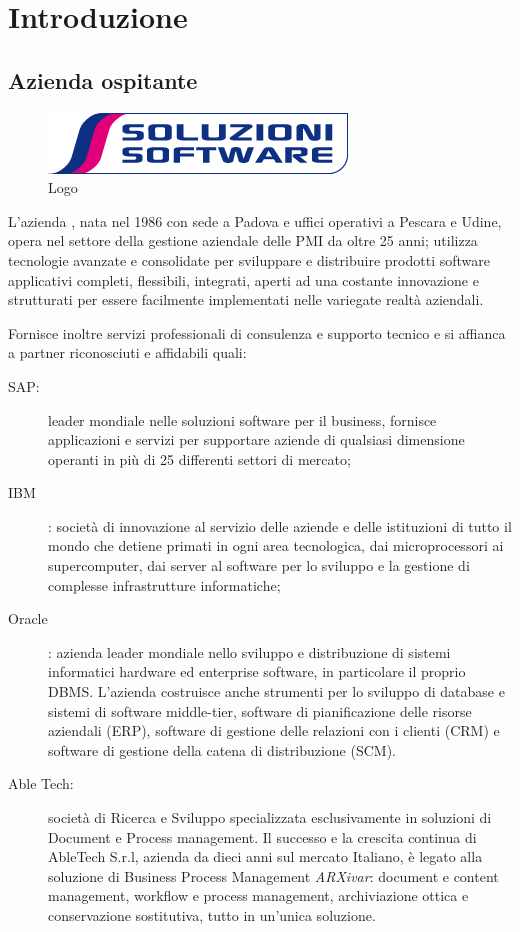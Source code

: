 \chapter{Introduzione}\label{ch:introduzione}

\section{Azienda ospitante}

\begin{figure}[htb]
\centering
\includegraphics[scale=0.7]{gfx/S2_logo}
\caption{Logo \myCompanyExtended}
\label{fig:soluzioni software}
\end{figure}

L'azienda \myCompanyExtended, nata nel 1986 con sede a Padova e uffici operativi a Pescara e Udine, opera nel settore della gestione aziendale delle \acs{PMI} da oltre 25 anni; utilizza tecnologie avanzate e consolidate per sviluppare e distribuire prodotti software applicativi completi, flessibili, integrati, aperti ad una costante innovazione e strutturati per essere facilmente implementati nelle variegate realtà aziendali.

Fornisce inoltre servizi professionali di consulenza e supporto tecnico e si affianca a partner riconosciuti e affidabili quali:
\begin{description}
	\item[SAP:] leader mondiale nelle soluzioni software per il business, fornisce applicazioni e servizi per supportare aziende di qualsiasi dimensione operanti in più di 25 differenti settori di mercato;
	\item[IBM]: società di innovazione al servizio delle aziende e delle istituzioni di tutto il mondo che detiene primati in ogni area tecnologica, dai microprocessori ai supercomputer, dai server al software per lo sviluppo e la gestione di complesse infrastrutture informatiche;
	\item[Oracle]: azienda leader mondiale nello sviluppo e distribuzione di sistemi informatici hardware ed enterprise software, in particolare il proprio \ac{DBMS}.
	L'azienda costruisce anche strumenti per lo sviluppo di database e sistemi di software middle-tier, software di pianificazione delle risorse aziendali (\ac{ERP}), software di gestione delle relazioni con i clienti (\ac{CRM}) e software di gestione della catena di distribuzione (\ac{SCM}).
	\item[Able Tech:] società di Ricerca e Sviluppo specializzata esclusivamente in soluzioni di Document e Process management. Il successo e la crescita continua di AbleTech S.r.l, azienda da dieci anni sul mercato Italiano, è legato alla soluzione di Business Process Management \emph{ARXivar}: document e content management, workflow e process management, archiviazione ottica e conservazione sostitutiva, tutto in un'unica soluzione.
\end{description}


